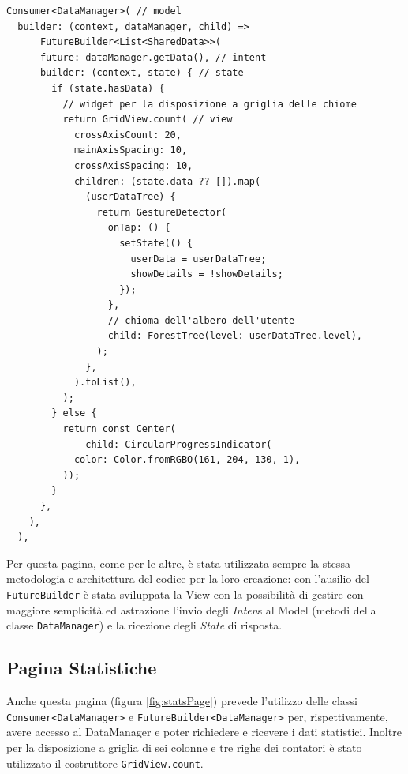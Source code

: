 \begin{lstlisting}[style=FlutterStyle, caption={Parte del codice per la creazione del bosco della Homepage}, label={lst:homepageCode}]
  Consumer<DataManager>( // model
  builder: (context, dataManager, child) =>
      FutureBuilder<List<SharedData>>(
      future: dataManager.getData(), // intent
      builder: (context, state) { // state 
        if (state.hasData) {
          // widget per la disposizione a griglia delle chiome
          return GridView.count( // view
            crossAxisCount: 20,
            mainAxisSpacing: 10,
            crossAxisSpacing: 10,
            children: (state.data ?? []).map(
              (userDataTree) {
                return GestureDetector(
                  onTap: () {
                    setState(() {
                      userData = userDataTree;
                      showDetails = !showDetails;
                    });
                  },
                  // chioma dell'albero dell'utente
                  child: ForestTree(level: userDataTree.level),
                );
              },
            ).toList(),
          );
        } else {
          return const Center(
              child: CircularProgressIndicator(
            color: Color.fromRGBO(161, 204, 130, 1),
          ));
        }
      },
    ),
  ),
\end{lstlisting}
Per questa pagina, come per le altre, è stata utilizzata sempre la stessa metodologia e architettura del codice per la loro creazione: con l'ausilio del \texttt{FutureBuilder} è stata sviluppata la View con la possibilità di gestire con maggiore semplicità ed astrazione l'invio degli \textit{Inten}s al Model (metodi della classe \texttt{DataManager}) e la ricezione degli \textit{State} di risposta.

%
%
\subsection{Pagina Statistiche}
Anche questa pagina (figura \ref{fig:statsPage}) prevede l'utilizzo delle classi \texttt{Consumer<DataManager>} e \texttt{FutureBuilder<DataManager>} per, rispettivamente, avere accesso al DataManager e poter richiedere e ricevere i dati statistici. Inoltre per la disposizione a griglia di sei colonne e tre righe dei contatori è stato utilizzato il costruttore \texttt{GridView.count}.


